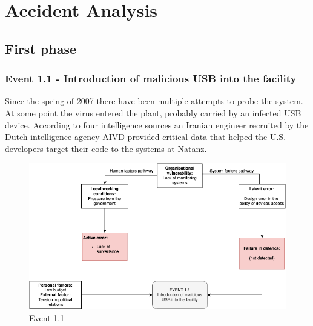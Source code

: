 \documentclass[12pt]{article}
\begin{document}
\section{Accident Analysis}
    \subsection{First phase}
    \subsubsection{Event 1.1 - Introduction of malicious USB into the facility}
    Since the spring of 2007 there have been multiple attempts to probe the system. At some point the virus entered the plant, probably carried by an infected USB device. According to four intelligence sources an Iranian engineer recruited by the Dutch intelligence agency AIVD provided critical data that helped the U.S. developers target their code to the systems at Natanz.
    
        \begin{figure}[H]
        \centering
        \includegraphics[height=0.6\textwidth]{event11.png}
        \caption{Event 1.1}
        \label{fig:event11}
        \end{figure}
        
\end{document}
